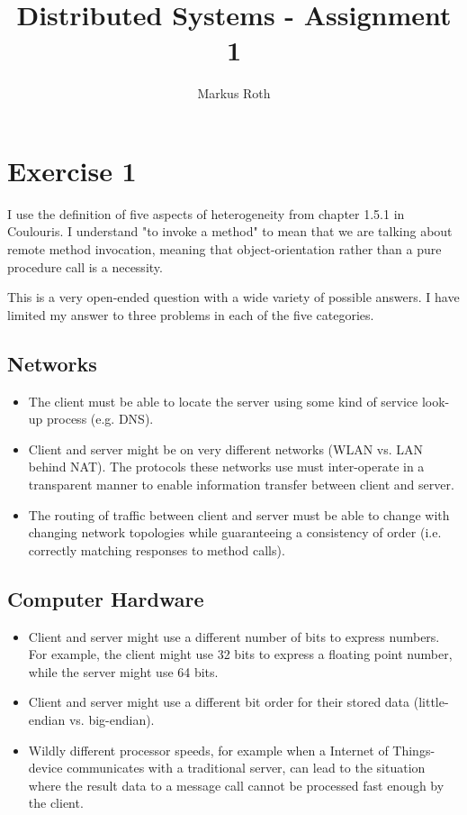 \documentclass[a4paper]{article}
\title{Distributed Systems - Assignment 1}
\author{Markus Roth}
\begin{document}
\maketitle

\section{Exercise 1}

I use the definition of five aspects of heterogeneity from chapter 1.5.1 in Coulouris. I understand "to invoke a method" to mean that we are talking about remote method invocation, meaning that object-orientation rather than a pure procedure call is a necessity.

This is a very open-ended question with a wide variety of possible answers. I have limited my answer to three problems in each of the five categories.

\subsection{Networks}

\begin{itemize}

    \item The client must be able to locate the server using some kind of service look-up process (e.g. DNS).

    \item Client and server might be on very different networks (WLAN vs. LAN behind NAT). The protocols these networks use must inter-operate in a transparent manner to enable information transfer between client and server.

    \item The routing of traffic between client and server must be able to change with changing network topologies while guaranteeing a consistency of order (i.e. correctly matching responses to method calls).

\end{itemize}

\subsection{Computer Hardware}

\begin{itemize}

    \item Client and server might use a different number of bits to express numbers. For example, the client might use 32 bits to express a floating point number, while the server might use 64 bits.

    \item Client and server might use a different bit order for their stored data (little-endian vs. big-endian). 

    \item Wildly different processor speeds, for example when a Internet of Things-device communicates with a traditional server, can lead to the situation where the result data to a message call cannot be processed fast enough by the client.

\end{itemize}
\end{document}

